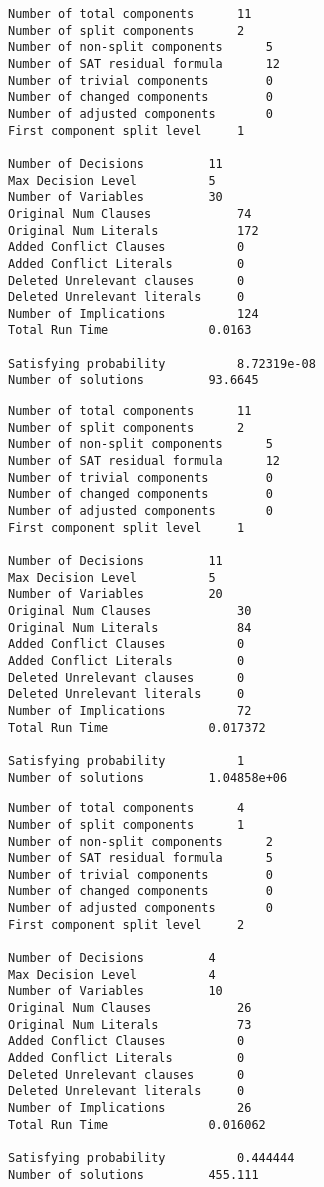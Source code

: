 \begin{lstlisting}[caption={Cachet on ENC1 encoding of Cancer network}]
Number of total components		11
Number of split components		2
Number of non-split components		5
Number of SAT residual formula		12
Number of trivial components		0
Number of changed components		0
Number of adjusted components		0
First component split level		1

Number of Decisions			11
Max Decision Level			5
Number of Variables			30
Original Num Clauses			74
Original Num Literals			172
Added Conflict Clauses			0
Added Conflict Literals			0
Deleted Unrelevant clauses		0
Deleted Unrelevant literals		0
Number of Implications			124
Total Run Time				0.0163

Satisfying probability			8.72319e-08
Number of solutions			93.6645
\end{lstlisting}

\begin{lstlisting}[caption={Cachet on ENC2 encoding of Cancer network}]
Number of total components		11
Number of split components		2
Number of non-split components		5
Number of SAT residual formula		12
Number of trivial components		0
Number of changed components		0
Number of adjusted components		0
First component split level		1

Number of Decisions			11
Max Decision Level			5
Number of Variables			20
Original Num Clauses			30
Original Num Literals			84
Added Conflict Clauses			0
Added Conflict Literals			0
Deleted Unrelevant clauses		0
Deleted Unrelevant literals		0
Number of Implications			72
Total Run Time				0.017372

Satisfying probability			1
Number of solutions			1.04858e+06
\end{lstlisting}

\begin{lstlisting}[caption={Cachet on WCNF encoding of Monty Hall}]
Number of total components		4
Number of split components		1
Number of non-split components		2
Number of SAT residual formula		5
Number of trivial components		0
Number of changed components		0
Number of adjusted components		0
First component split level		2

Number of Decisions			4
Max Decision Level			4
Number of Variables			10
Original Num Clauses			26
Original Num Literals			73
Added Conflict Clauses			0
Added Conflict Literals			0
Deleted Unrelevant clauses		0
Deleted Unrelevant literals		0
Number of Implications			26
Total Run Time				0.016062

Satisfying probability			0.444444
Number of solutions			455.111
\end{lstlisting}

